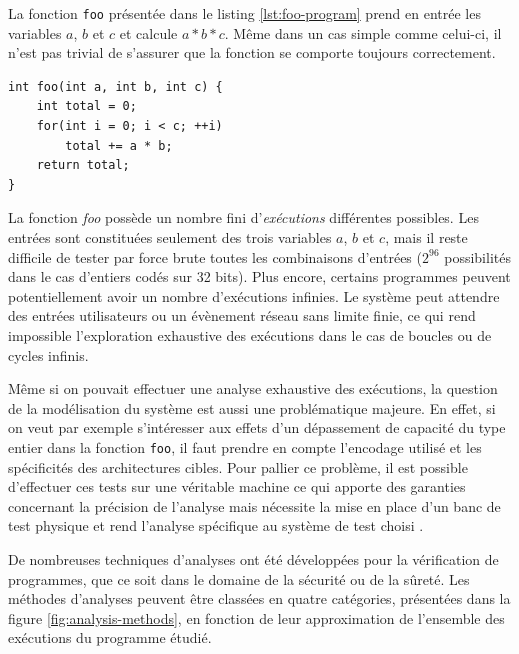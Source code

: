         La fonction \texttt{foo} présentée dans le listing \ref{lst:foo-program} prend en entrée les variables $a$, $b$ et $c$ et calcule $a*b*c$. Même dans un cas simple comme celui-ci, il n'est pas trivial de s'assurer que la fonction se comporte toujours correctement.

\begin{lstlisting}[caption={Fonction foo}, label=lst:foo-program]
int foo(int a, int b, int c) {
    int total = 0;
    for(int i = 0; i < c; ++i)
        total += a * b;
    return total;
}
\end{lstlisting}        

        La fonction \textit{foo} possède un nombre fini d'\textit{exécutions} différentes possibles. Les entrées sont constituées seulement des trois variables  $a$, $b$ et $c$, mais il reste difficile de tester par force brute toutes les combinaisons d'entrées ($2^{96}$ possibilités dans le cas d'entiers codés sur 32 bits).
        Plus encore, certains programmes peuvent potentiellement avoir un nombre d'exécutions infinies. Le système peut attendre des entrées utilisateurs ou un évènement réseau sans limite finie, ce qui rend impossible l'exploration exhaustive des exécutions dans le cas de boucles ou de cycles infinis.
        
        Même si on pouvait effectuer une analyse exhaustive des exécutions, la question de la modélisation du système est aussi une problématique majeure. En effet, si on veut par exemple s'intéresser aux effets d'un dépassement de capacité du type entier dans la fonction \texttt{foo}, il faut prendre en compte l'encodage utilisé et les spécificités des architectures cibles. 
        Pour pallier ce problème, il est possible d'effectuer ces tests sur une véritable machine ce qui apporte des garanties concernant la précision de l'analyse mais nécessite la mise en place d'un banc de test physique et rend l'analyse spécifique au système de test choisi \cite{Faurax/Phd09}.
        
        De nombreuses techniques d'analyses ont été développées pour la vérification de programmes, que ce soit dans le domaine de la sécurité ou de la sûreté. Les méthodes d'analyses peuvent être classées en quatre catégories, présentées dans la figure \ref{fig:analysis-methods}, en fonction de leur approximation de l'ensemble des exécutions du programme étudié.
    

